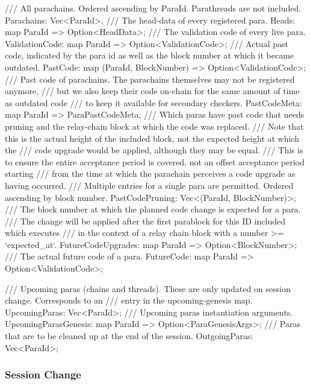 \begin{verbnobox}[\small]
/// All parachains. Ordered ascending by ParaId. Parathreads are not included.
Parachains: Vec<ParaId>,
/// The head-data of every registered para.
Heads: map ParaId => Option<HeadData>;
/// The validation code of every live para.
ValidationCode: map ParaId => Option<ValidationCode>;
/// Actual past code, indicated by the para id as well as the block number at which it became outdated.
PastCode: map (ParaId, BlockNumber) => Option<ValidationCode>;
/// Past code of parachains. The parachains themselves may not be registered anymore,
/// but we also keep their code on-chain for the same amount of time as outdated code
/// to keep it available for secondary checkers.
PastCodeMeta: map ParaId => ParaPastCodeMeta;
/// Which paras have past code that needs pruning and the relay-chain block at which the code was replaced.
/// Note that this is the actual height of the included block, not the expected height at which the
/// code upgrade would be applied, although they may be equal.
/// This is to ensure the entire acceptance period is covered, not an offset acceptance period starting
/// from the time at which the parachain perceives a code upgrade as having occurred.
/// Multiple entries for a single para are permitted. Ordered ascending by block number.
PastCodePruning: Vec<(ParaId, BlockNumber)>;
/// The block number at which the planned code change is expected for a para.
/// The change will be applied after the first parablock for this ID included which executes
/// in the context of a relay chain block with a number >= `expected_at`.
FutureCodeUpgrades: map ParaId => Option<BlockNumber>;
/// The actual future code of a para.
FutureCode: map ParaId => Option<ValidationCode>;

/// Upcoming paras (chains and threads). These are only updated on session change. Corresponds to an
/// entry in the upcoming-genesis map.
UpcomingParas: Vec<ParaId>;
/// Upcoming paras instantiation arguments.
UpcomingParasGenesis: map ParaId => Option<ParaGenesisArgs>;
/// Paras that are to be cleaned up at the end of the session.
OutgoingParas: Vec<ParaId>;
\end{verbnobox}

\subsubsection{Session Change}

